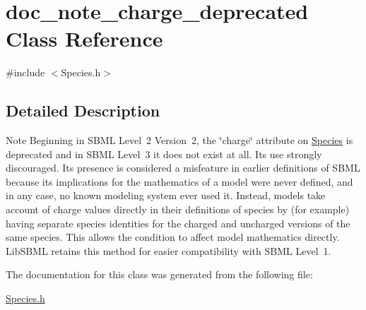 \hypertarget{classdoc__note__charge__deprecated}{}\section{doc\+\_\+note\+\_\+charge\+\_\+deprecated Class Reference}
\label{classdoc__note__charge__deprecated}


{\ttfamily \#include $<$Species.\+h$>$}



\subsection{Detailed Description}
\begin{DoxyNote}{Note}
Beginning in S\+B\+ML Level~2 Version~2, the \char`\"{}charge\char`\"{} attribute on \hyperlink{class_species}{Species} is deprecated and in S\+B\+ML Level~3 it does not exist at all. Its use strongly discouraged. Its presence is considered a misfeature in earlier definitions of S\+B\+ML because its implications for the mathematics of a model were never defined, and in any case, no known modeling system ever used it. Instead, models take account of charge values directly in their definitions of species by (for example) having separate species identities for the charged and uncharged versions of the same species. This allows the condition to affect model mathematics directly. Lib\+S\+B\+ML retains this method for easier compatibility with S\+B\+ML Level~1. 
\end{DoxyNote}


The documentation for this class was generated from the following file\+:\begin{DoxyCompactItemize}
\item 
\hyperlink{_species_8h}{Species.\+h}\end{DoxyCompactItemize}
